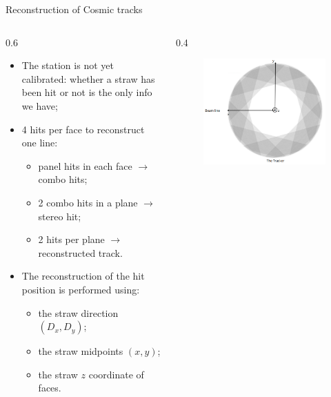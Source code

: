 \documentclass{beamer}[10pt]
\begin{document}
\begin{frame}{Reconstruction of Cosmic tracks}
  \begin{columns}
    \begin{column}{0.6 \framewidth}
      \begin{itemize}
  \item The station is not yet calibrated: whether a straw has been hit or not is the only info we have;
  \vspace{3mm}
\item 4 hits per face to reconstruct one line:
        \begin{itemize}
          \item panel hits in each face $\rightarrow$ combo hits;
          \item 2 combo hits in a plane $\rightarrow$ stereo hit;
          \item 2 hits per plane $\rightarrow$ reconstructed track.
        \end{itemize}
        \vspace{3mm}

  \item The reconstruction of the hit position is performed using:
  \vspace{2mm}

    \begin{itemize}
        \item the straw direction  $(D_x,D_y)$;
        \vspace{1mm}
        \item the straw midpoints $(x,y)$;
        \vspace{1mm}
        \item the straw $z$ coordinate of faces.
    \end{itemize} 
  \end{itemize} 
  \end{column}
  \begin{column}{0.4 \framewidth}
    \begin{figure}[H]
      \centering
      \includegraphics[width=0.8 \columnwidth]{figures/png/Screenshot_20240408_154724.png}
      \label{fig:enter-label}
  \end{figure}
  \end{column}

  \end{columns}
  \end{frame}
\end{document}
